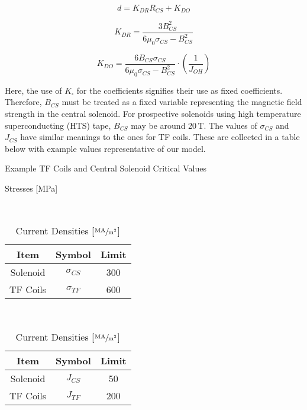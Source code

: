  \begin{equation}
 	\label{eq:dd}
	d = K_{DR} R_{CS} + K_{DO}
\end{equation}

\begin{equation}
	K_{DR} = \frac{3 B_{CS}^2}{ 6 \mu_0 \sigma_{CS}  - B_{CS}^2 }
\end{equation}

\begin{equation}
	K_{DO} = \frac{6 B_{CS} \sigma_{CS}}{ 6 \mu_0 \sigma_{CS}  - B_{CS}^2 } \cdot \left( \frac{1}{J_{OH}} \right)
\end{equation}

Here, the use of $K_\square$ for the coefficients signifies their use as fixed coefficients. Therefore, $B_{CS}$ must be treated as a fixed variable representing the magnetic field strength in the central solenoid. For prospective solenoids using high temperature superconducting (HTS) tape, $B_{CS}$ may be around 20\,T. The values of $\sigma_{CS}$ and $J_{CS}$ have similar meanings to the ones for TF coils. These are collected in a table below with example values representative of our model.

\begin{table}[h!]
\centering	
\caption{Example TF Coils and Central Solenoid Critical Values}
\hfill
\begin{subtable}[t]{0.45\textwidth}
\centering	
\caption{Stresses [MPa]} ~\\
\begin{tabular}{ c|c|c } 

\textbf{Item} & \textbf{Symbol} & \textbf{Limit} \\
\hline
Solenoid & $\sigma_{CS}$ & 300 \\ 
TF Coils & $\sigma_{TF}$ & 600 \\ 
\end{tabular}
\end{subtable}
\hfill
\begin{subtable}[t]{0.45\textwidth}
\centering	
\caption{Current Densities [$\sfrac{\textnormal{MA}}{\textnormal{m}^2}$]} ~\\
\begin{tabular}{ c|c|c } 

\textbf{Item} & \textbf{Symbol} & \textbf{Limit} \\
\hline
Solenoid & $J_{CS}$ & 50 \\ 
TF Coils & $J_{TF}$ & 200 \\ 
\end{tabular}
\end{subtable}
\hfill
\hfill
\end{table}

